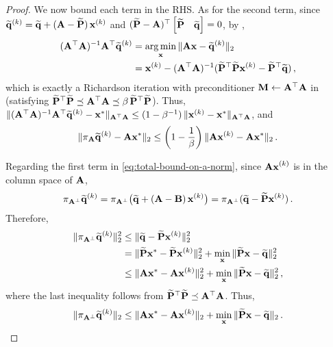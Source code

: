 \begin{proof}
We now bound each term in the RHS. As for the second term, since $\widetilde{\mathbf{q}}^{(k)} = \widetilde{\mathbf{q}} + (\mathbf{A} - \widetilde{\mathbf{P}})\, \mathbf{x}^{(k)}$ and $(\widetilde{\mathbf{P}}-\mathbf{A})^\top \begin{bmatrix}
\widetilde{\mathbf{P}} & \widetilde{\mathbf{q}} \end{bmatrix} = 0$, by ,
\begin{align*}
    (\mathbf{A}^\top \mathbf{A})^{-1} \mathbf{A}^\top\widetilde{\mathbf{q}}^{(k)}
    &=
    \operatorname*{arg\,min}_{\mathbf{x}}\,\lVert\mathbf{Ax}-\widetilde{\mathbf{q}}^{(k)}\rVert_2 \\
    &=
    \mathbf{x}^{(k)} - (\mathbf{A}^\top \mathbf{A})^{-1} (\widetilde{\mathbf{P}}^\top\widetilde{\mathbf{P}}\mathbf{x}^{(k)} - \widetilde{\mathbf{P}}^\top\widetilde{\mathbf{q}})\,,
\end{align*}
which is exactly a Richardson iteration with preconditioner $\mathbf{M}\gets \mathbf{A}^\top \mathbf{A}$ in  (satisfying $\widetilde{\mathbf{P}}^\top \widetilde{\mathbf{P}} \preceq \mathbf{A}^\top \mathbf{A}\preceq \beta\,\widetilde{\mathbf{P}}^\top \widetilde{\mathbf{P}}$). 
Thus, $\lVert(\mathbf{A}^\top \mathbf{A})^{-1} \mathbf{A}^\top\widetilde{\mathbf{q}}^{(k)} - \mathbf{x}^*\rVert_{\mathbf{A}^\top \mathbf{A}} \leq (1-\beta^{-1})\,\lVert\mathbf{x}^{(k)} - \mathbf{x}^*\rVert_{\mathbf{A}^\top \mathbf{A}}$, and
\begin{equation}
    \label{eq:second-term-bound-on-a-norm}
    \norm{\pi_{\mat A}\widetilde{\mat{q}}^{(k)} - \mat{A} \mat{x}^*}_2
    \leq
    \parens*{1-\frac 1 \beta}\, \norm{\mat{A} \mat{x}^{(k)} - \mat{A}\mat{x}^*}_2\,.
\end{equation}

Regarding the first term in \eqref{eq:total-bound-on-a-norm}, since $\mathbf{Ax}^{(k)}$ is in the column space of $\mathbf{A}$,
\[
\pi_{\mathbf{A}^\perp}\widetilde{\mathbf{q}}^{(k)} 
= 
\pi_{\mathbf{A}^\perp}\bigl(\widetilde{\mathbf{q}} +(\mathbf{A-B})\,\mathbf{x}^{(k)}\bigr)
=
\pi_{\mathbf{A}^\perp}(\widetilde{\mathbf{q}} - \widetilde{\mathbf{P}} \mathbf{x}^{(k)})\,.
\]
Therefore,
\begin{align*}
\lVert\pi_{\mathbf{A}^\perp}\widetilde{\mathbf{q}}^{(k)}\rVert_2^2
& \leq 
\lVert\widetilde{\mathbf{q}} - \widetilde{\mathbf{P}} \mathbf{x}^{(k)}\rVert_2^2
\\ & =
\lVert\widetilde{\mathbf{P}} \mathbf{x}^{*} - \widetilde{\mathbf{P}} \mathbf{x}^{(k)}\rVert_2^2 + \min_{\mathbf{x}}\, \lVert\widetilde{\mathbf{P}} \mathbf{x}-\widetilde{\mathbf{q}}\rVert_2^2
\\ & \leq 
\lVert\mathbf{A} \mathbf{x}^{*} - \mathbf{A} \mathbf{x}^{(k)}\rVert_2^2 + \min_{\mathbf{x}}\, \lVert\widetilde{\mathbf{P}} \mathbf{x}-\widetilde{\mathbf{q}}\rVert_2^2\,,
\end{align*}
where the last inequality follows from $\widetilde{\mathbf{P}}^\top \widetilde{\mathbf{P}} \preceq \mathbf{A}^\top \mathbf{A}$.
Thus,
\begin{equation}
\label{eq:first-term-bound-on-a-norm}
\lVert\pi_{\mathbf{A}^\perp}\widetilde{\mathbf{q}}^{(k)}\rVert_2
\leq 
\lVert\mathbf{A} \mathbf{x}^{*} - \mathbf{A} \mathbf{x}^{(k)}\rVert_2 + \min_{\mathbf{x}}\, \lVert\widetilde{\mathbf{P}} \mathbf{x}-\widetilde{\mathbf{q}}\rVert_2\,.
\end{equation}


\end{proof}
